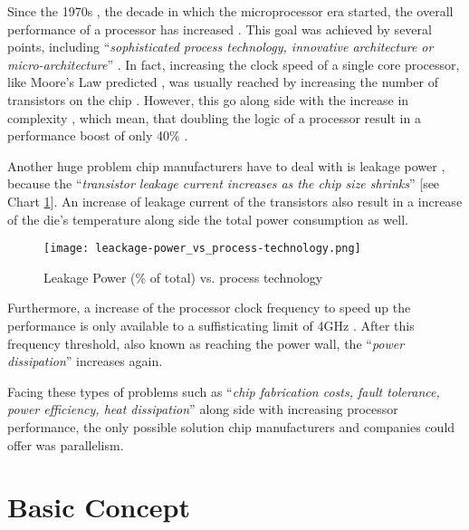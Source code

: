 Since the 1970s \parencite{article14}, the decade in which the microprocessor era started, the overall performance of a processor has increased \parencite{inproceedings4}. This goal was achieved by several points, including ``\textit{sophisticated process technology, innovative architecture or micro-architecture}'' \parencite[see][Chapter 1, p2]{inproceedings4}. In fact, increasing the clock speed of a single core processor, like Moore's Law predicted \parencite{article14}, was usually reached by increasing the number of transistors on the chip \parencite{article14}. However, this go along side with the increase in complexity \parencite[see][Pollack’s rule]{article14}, which mean, that doubling the logic of a processor result in a performance boost of only 40\% \parencite[see][Chapter 2]{article14}.

Another huge problem chip manufacturers have to deal with is leakage power \parencite[see][Chapter 2, p3]{inproceedings4}, because the ``\textit{transistor leakage current increases as the chip size shrinks}'' \parencite[see][p2]{article14} [see Chart \ref{fig:leackagePer}]. An increase of leakage current of the transistors also result in a increase of the die's temperature \parencite{inproceedings4} along side the total power consumption as well.
\begin{figure}[h!]
	\centering
	\texttt{[image: leackage-power\_vs\_process-technology.png]}
	\caption{
		Leakage Power (\% of total) vs. process technology \parencite{inproceedings4}
	}
	\label{fig:leackagePer}
\end{figure}

Furthermore, a increase of the processor clock frequency to speed up the performance is only available to a suffisticating limit of 4GHz \parencite{article14}. After this frequency threshold, also known as reaching the power wall, the ``\textit{power dissipation}'' \parencite[see][p2]{article14} increases again.

Facing these types of problems such as ``\textit{chip fabrication costs, fault tolerance, power efficiency, heat dissipation}'' \parencite[see][p3]{article14} along side with increasing processor performance, the only possible solution chip manufacturers and companies could offer was parallelism. 

\newpage

\section{Basic Concept}

